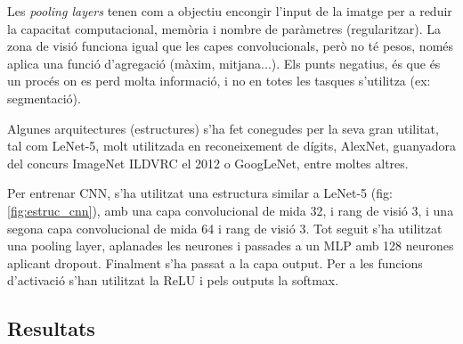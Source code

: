 \documentclass[12pt, spanish]{article}
\begin{document}
Les \textit{pooling layers} tenen com a objectiu encongir l'input de la imatge per a reduir la capacitat computacional, memòria i nombre de paràmetres (regularitzar). La zona de visió funciona igual que les capes convolucionals, però no té pesos, només aplica una funció d'agregació (màxim, mitjana...). Els punts negatius, és que és un procés on es perd molta informació, i no en totes les tasques s'utilitza (ex: segmentació).

Algunes arquitectures (estructures) s'ha fet conegudes per la seva gran utilitat, tal com LeNet-5, molt utilitzada en reconeixement de dígits, AlexNet, guanyadora del concurs ImageNet ILDVRC el 2012 o GoogLeNet, entre moltes altres.

Per entrenar CNN, s'ha utilitzat una estructura similar a LeNet-5 (fig:\ref{fig:estruc_cnn}), amb una capa convolucional de mida 32, i rang de visió 3, i una segona capa convolucional de mida 64 i rang de visió 3. Tot seguit s'ha utilitzat una pooling layer, aplanades les neurones i passades a un MLP amb 128 neurones aplicant dropout. Finalment s'ha passat a la capa output. Per a les funcions d'activació s'han utilitzat la ReLU i pels outputs la softmax.




\subsection{Resultats}
\end{document}
